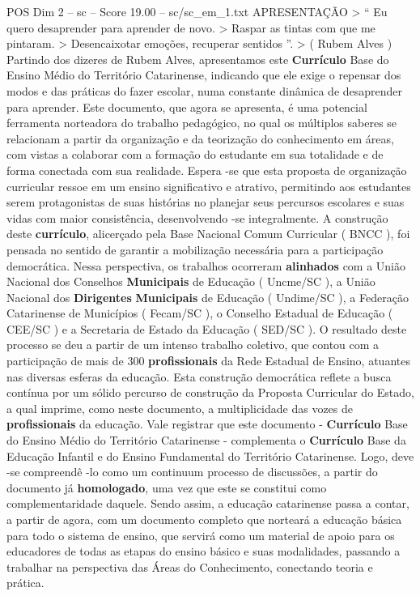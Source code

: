 \begin{textsample}{POS Dim 2 – sc – Score 19.00 – sc/sc\_em\_1.txt}  \label{ex:f2_pos_020}
APRESENTAÇÃO > “ Eu quero desaprender para aprender de novo. > Raspar as tintas com que me pintaram. > Desencaixotar emoções, recuperar sentidos ”. > ( Rubem Alves ) Partindo dos dizeres de Rubem Alves, apresentamos este \textbf{Currículo} Base do Ensino Médio do Território Catarinense, indicando que ele exige o repensar dos modos e das práticas do fazer escolar, numa constante dinâmica de desaprender para aprender.
Este documento, que agora se apresenta, é uma potencial ferramenta norteadora do trabalho pedagógico, no qual os múltiplos saberes se relacionam a partir da organização e da teorização do conhecimento em áreas, com vistas a colaborar com a formação do estudante em sua totalidade e de forma conectada com sua realidade.
Espera -se que esta proposta de organização curricular ressoe em um ensino significativo e atrativo, permitindo aos estudantes serem protagonistas de suas histórias no planejar seus percursos escolares e suas vidas com maior consistência, desenvolvendo -se integralmente.
A construção deste \textbf{currículo}, alicerçado pela Base Nacional Comum Curricular ( BNCC ), foi pensada no sentido de garantir a mobilização necessária para a participação democrática.
Nessa perspectiva, os trabalhos ocorreram \textbf{alinhados} com a União Nacional dos Conselhos \textbf{Municipais} de Educação ( Uncme/SC ), a União Nacional dos \textbf{Dirigentes} \textbf{Municipais} de Educação ( Undime/SC ), a Federação Catarinense de Municípios ( Fecam/SC ), o Conselho Estadual de Educação ( CEE/SC ) e a Secretaria de Estado da Educação ( SED/SC ).
O resultado deste processo se deu a partir de um intenso trabalho coletivo, que contou com a participação de mais de 300 \textbf{profissionais} da Rede Estadual de Ensino, atuantes nas diversas esferas da educação.
Esta construção democrática reflete a busca contínua por um sólido percurso de construção da Proposta Curricular do Estado, a qual imprime, como neste documento, a multiplicidade das vozes de \textbf{profissionais} da educação.
Vale registrar que este documento - \textbf{Currículo} Base do Ensino Médio do Território Catarinense - complementa o \textbf{Currículo} Base da Educação Infantil e do Ensino Fundamental do Território Catarinense.
Logo, deve -se compreendê -lo como um continuum processo de discussões, a partir do documento já \textbf{homologado}, uma vez que este se constitui como complementaridade daquele.
Sendo assim, a educação catarinense passa a contar, a partir de agora, com um documento completo que norteará a educação básica para todo o sistema de ensino, que servirá como um material de apoio para os educadores de todas as etapas do ensino básico e suas modalidades, passando a trabalhar na perspectiva das Áreas do Conhecimento, conectando teoria e prática.

\end{textsample}
